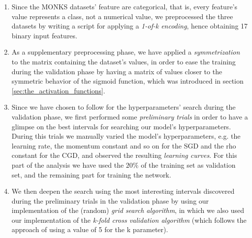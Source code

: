         \begin{enumerate}
            \item Since the MONKS datasets’ feature are categorical, that is, every feature’s value represents
            a class, not a numerical value, we preprocessed the three datasets by writing a script
            for applying a \textit{1-of-k encoding}, hence obtaining 17 binary input features.
            \item As a supplementary preprocessing phase, we have applied a \textit{symmetrization} to the
            matrix containing the dataset’s values, in order to ease the training during the validation phase
            by having a matrix of values closer to the symmetric behavior of the sigmoid function, which was
            introduced in section \ref{sec:the_activation_functions}.
            \item Since we have chosen to follow \cite{Bergstra:2012:RSH:2188385.2188395} for the
            hyperparameters' search during the validation phase, we first performed some
            \textit{preliminary trials} in order to have a glimpse on the best intervals for searching our
            model's hyperparameters. During this trials we manually varied the model's hyperparameters, e.g.
            the learning rate, the momentum constant and so on for the SGD and the rho constant for the CGD,
            and observed the resulting \textit{learning curves}. For this part of the analysis we have used
            the $20\%$ of the training set as validation set, and the remaining part for training the network.
            \item We then deepen the search using the most interesting intervals discovered during the
            preliminary trials in the validation phase by using our implementation of the (random)
            \textit{grid search algorithm}, in which we also used our implementation of the
            \textit{k-fold cross validation algorithm} (which follows the approach of using a value
            of 5 for the k parameter).
        \end{enumerate}

